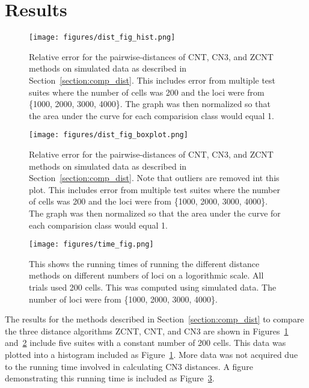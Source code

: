 \section{Results}

\begin{figure}[ht]
    \centering
    \texttt{[image: figures/dist\_fig\_hist.png]}
    \caption{Relative error for the pairwise-distances of CNT, CN3, and ZCNT methods on simulated data as described in Section~\ref{section:comp_dist}. This includes error from multiple test suites where the number of cells was 200 and the loci were from \{1000, 2000, 3000, 4000\}. The graph was then normalized so that the area under the curve for each comparision class would equal 1.}\label{fig:dist_figure_histogram}
\end{figure}

\begin{figure}[ht]
    \centering
    \texttt{[image: figures/dist\_fig\_boxplot.png]}
    \caption{Relative error for the pairwise-distances of CNT, CN3, and ZCNT methods on simulated data as described in Section~\ref{section:comp_dist}. Note that outliers are removed int this plot. This includes error from multiple test suites where the number of cells was 200 and the loci were from \{1000, 2000, 3000, 4000\}. The graph was then normalized so that the area under the curve for each comparision class would equal 1.}\label{fig:dist_fig_box}
\end{figure}

\begin{figure}[ht]
    \centering 
    \texttt{[image: figures/time\_fig.png]}
    \caption{This shows the running times of running the different distance methods on different numbers of loci on a logorithmic scale. All trials used 200 cells. This was computed using simulated data. The number of loci were from \{1000, 2000, 3000, 4000\}.}\label{fig:time_fig}
\end{figure} 

The results for the methods described in Section~\ref{section:comp_dist} to compare the three distance algorithms ZCNT, CNT, and CN3 are shown in Figures~\ref{fig:dist_figure_histogram} and~\ref{fig:dist_fig_box} include five suites with a constant number of 200 cells. This data was plotted into a histogram included as Figure~\ref{fig:dist_figure_histogram}. More data was not acquired due to the running time involved in calculating CN3 distances. A figure demonstrating this running time is included as Figure~\ref{fig:time_fig}.

